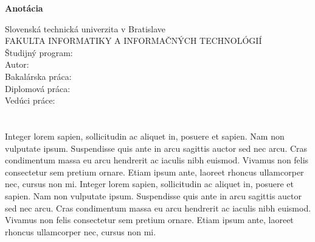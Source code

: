 \newpage
\thispagestyle{plain}
\begin{center}
\begin{Large}
\textbf{Anotácia} \\
\end{Large}
\end{center}
Slovenská technická univerzita v Bratislave \\
FAKULTA INFORMATIKY A INFORMAČNÝCH TECHNOLÓGIÍ \\
\noindent
Študijný program: \Program \\
\noindent
Autor: \Author \\
{
	{Bakalárska práca: }\Title \\
}
{
	{Diplomová práca: }\Title \\
}
Vedúci práce: \Supervisor \\
\Month{ }\Year \\
\noindent
\\
Integer lorem sapien, sollicitudin ac aliquet in, posuere et sapien. Nam non vulputate ipsum. Suspendisse quis ante in arcu sagittis auctor sed nec arcu. Cras condimentum massa eu arcu hendrerit ac iaculis nibh euismod. Vivamus non felis consectetur sem pretium ornare. Etiam ipsum ante, laoreet rhoncus ullamcorper nec, cursus non mi. Integer lorem sapien, sollicitudin ac aliquet in, posuere et sapien. Nam non vulputate ipsum. Suspendisse quis ante in arcu sagittis auctor sed nec arcu. Cras condimentum massa eu arcu hendrerit ac iaculis nibh euismod. Vivamus non felis consectetur sem pretium ornare. Etiam ipsum ante, laoreet rhoncus ullamcorper nec, cursus non mi.

